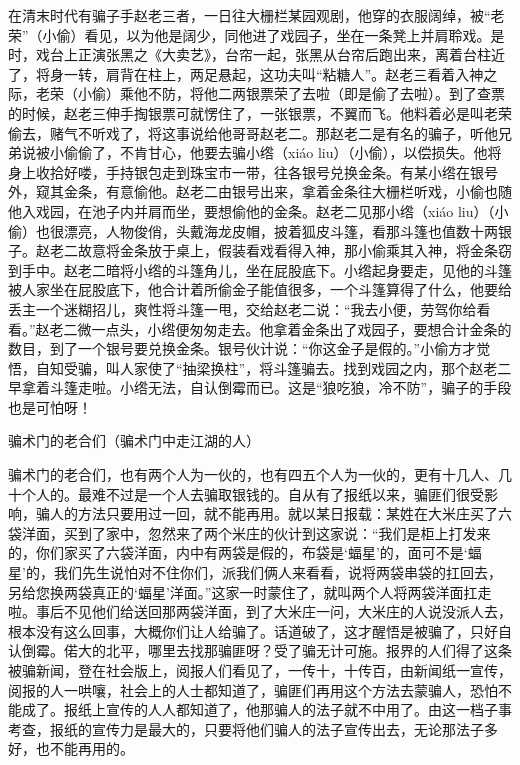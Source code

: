 \documentclass[12pt,UTF8]{ctexbook}
\begin{document}
在清末时代有骗子手赵老三者，一日往大栅栏某园观剧，他穿的衣服阔绰，被“老荣”（小偷）看见，以为他是阔少，同他进了戏园子，坐在一条凳上并肩聆戏。是时，戏台上正演张黑之《大卖艺》，台帘一起，张黑从台帘后跑出来，离着台柱近了，将身一转，肩背在柱上，两足悬起，这功夫叫“粘糖人”。赵老三看着入神之际，老荣（小偷）乘他不防，将他二两银票荣了去啦（即是偷了去啦）。到了查票的时候，赵老三伸手掏银票可就愣住了，一张银票，不翼而飞。他料着必是叫老荣偷去，赌气不听戏了，将这事说给他哥哥赵老二。那赵老二是有名的骗子，听他兄弟说被小偷偷了，不肯甘心，他要去骗小绺（xiáo liu）（小偷），以偿损失。他将身上收拾好喽，手持银包走到珠宝市一带，往各银号兑换金条。有某小绺在银号外，窥其金条，有意偷他。赵老二由银号出来，拿着金条往大栅栏听戏，小偷也随他入戏园，在池子内并肩而坐，要想偷他的金条。赵老二见那小绺（xiáo liu）（小偷）也很漂亮，人物俊俏，头戴海龙皮帽，披着狐皮斗篷，看那斗篷也值数十两银子。赵老二故意将金条放于桌上，假装看戏看得入神，那小偷乘其入神，将金条窃到手中。赵老二暗将小绺的斗篷角儿，坐在屁股底下。小绺起身要走，见他的斗篷被人家坐在屁股底下，他合计着所偷金子能值很多，一个斗篷算得了什么，他要给丢主一个迷糊招儿，爽性将斗篷一甩，交给赵老二说：“我去小便，劳驾你给看看。”赵老二微一点头，小绺便匆匆走去。他拿着金条出了戏园子，要想合计金条的数目，到了一个银号要兑换金条。银号伙计说：“你这金子是假的。”小偷方才觉悟，自知受骗，叫人家使了“抽梁换柱”，将斗篷骗去。找到戏园之内，那个赵老二早拿着斗篷走啦。小绺无法，自认倒霉而已。这是“狼吃狼，冷不防”，骗子的手段也是可怕呀！





骗术门的老合们（骗术门中走江湖的人）


骗术门的老合们，也有两个人为一伙的，也有四五个人为一伙的，更有十几人、几十个人的。最难不过是一个人去骗取银钱的。自从有了报纸以来，骗匪们很受影响，骗人的方法只要用过一回，就不能再用。就以某日报载：某姓在大米庄买了六袋洋面，买到了家中，忽然来了两个米庄的伙计到这家说：“我们是柜上打发来的，你们家买了六袋洋面，内中有两袋是假的，布袋是‘蝠星’的，面可不是‘蝠星’的，我们先生说怕对不住你们，派我们俩人来看看，说将两袋串袋的扛回去，另给您换两袋真正的‘蝠星’洋面。”这家一时蒙住了，就叫两个人将两袋洋面扛走啦。事后不见他们给送回那两袋洋面，到了大米庄一问，大米庄的人说没派人去，根本没有这么回事，大概你们让人给骗了。话道破了，这才醒悟是被骗了，只好自认倒霉。偌大的北平，哪里去找那骗匪呀？受了骗无计可施。报界的人们得了这条被骗新闻，登在社会版上，阅报人们看见了，一传十，十传百，由新闻纸一宣传，阅报的人一哄嚷，社会上的人士都知道了，骗匪们再用这个方法去蒙骗人，恐怕不能成了。报纸上宣传的人人都知道了，他那骗人的法子就不中用了。由这一档子事考查，报纸的宣传力是最大的，只要将他们骗人的法子宣传出去，无论那法子多好，也不能再用的。
\end{document}

